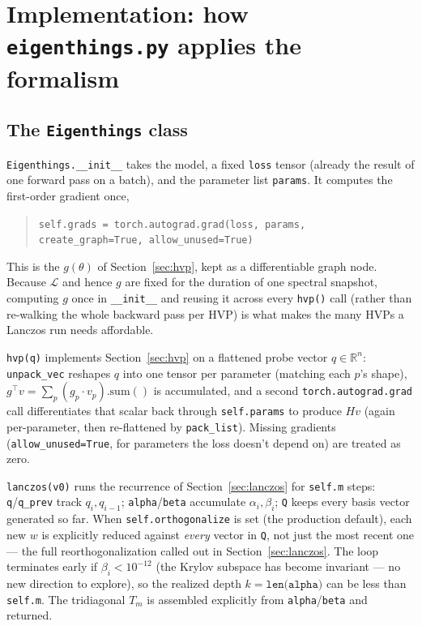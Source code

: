 \documentclass[11pt]{article}
\newcommand{\code}[1]{\texttt{#1}}
\newcommand{\R}{\mathbb{R}}
\begin{document}
\section{Implementation: how \code{eigenthings.py} applies the formalism}
\label{sec:implementation}

\subsection{The \code{Eigenthings} class}

\code{Eigenthings.__init__} takes the model, a fixed \code{loss} tensor
(already the result of one forward pass on a batch), and the parameter list
\code{params}. It computes the first-order gradient once,
\begin{quote}
\code{self.grads = torch.autograd.grad(loss, params, create_graph=True, allow_unused=True)}
\end{quote}
This is the \(g(\theta)\) of Section~\ref{sec:hvp}, kept as a differentiable
graph node. Because \(\mathcal{L}\) and hence \(g\) are fixed for the
duration of one spectral snapshot, computing \(g\) once in
\code{__init__} and reusing it across every \code{hvp()} call (rather than
re-walking the whole backward pass per HVP) is what makes the many HVPs
a Lanczos run needs affordable.

\code{hvp(q)} implements Section~\ref{sec:hvp} on a flattened probe vector
\(q \in \R^n\): \code{unpack_vec} reshapes \(q\) into one tensor per
parameter (matching each \(p\)'s shape), \(g^\top v = \sum_p (g_p \cdot
v_p).\mathrm{sum}()\) is accumulated, and a second \code{torch.autograd.grad}
call differentiates that scalar back through \code{self.params} to produce
\(Hv\) (again per-parameter, then re-flattened by \code{pack_list}). Missing
gradients (\code{allow_unused=True}, for parameters the loss doesn't
depend on) are treated as zero.

\code{lanczos(v0)} runs the recurrence of Section~\ref{sec:lanczos} for
\code{self.m} steps: \code{q}/\code{q_prev} track \(q_i, q_{i-1}\);
\code{alpha}/\code{beta} accumulate \(\alpha_i,\beta_i\); \code{Q} keeps
every basis vector generated so far. When \code{self.orthogonalize} is set
(the production default), each new \(w\) is explicitly reduced against
\emph{every} vector in \code{Q}, not just the most recent one --- the full
reorthogonalization called out in Section~\ref{sec:lanczos}. The loop
terminates early if \(\beta_i < 10^{-12}\) (the Krylov subspace has become
invariant --- no new direction to explore), so the realized depth \(k =
\code{len(alpha)}\) can be less than \code{self.m}. The tridiagonal \(T_m\)
is assembled explicitly from \code{alpha}/\code{beta} and returned.
\end{document}

